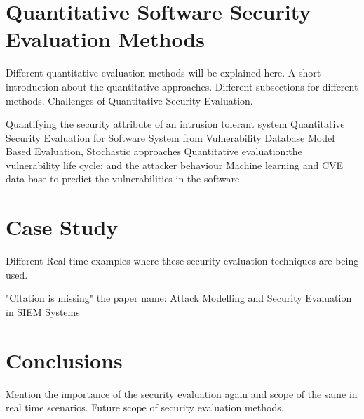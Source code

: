\documentclass[pdftex,english,oribibl]{llncs}
\begin{document}
\section{Quantitative Software Security Evaluation Methods}
Different quantitative evaluation methods will be explained here.\newline
A short introduction about the quantitative approaches.\newline
Different subsections for different methods.\newline
Challenges of Quantitative Security Evaluation.\newline

  	Quantifying the security attribute of an intrusion tolerant system\cite{1028941}\newline
  	Quantitative Security Evaluation for Software System from Vulnerability Database\cite{Okamura:2013:QSESVD}\newline
 	Model Based Evaluation, Stochastic approaches\cite{1335467}\newline
  	Quantitative evaluation:the vulnerability life cycle; and the attacker behaviour\cite{5315969}\newline
  	Machine learning and CVE data base to predict the vulnerabilities in the software\cite{Jain:2017:CAE:3102980.3102991}\newline
  	
\section{Case Study}
Different Real time examples where these security evaluation techniques are being used.\newline

	\cite{Kotenko}\newline
	"Citation is missing" the paper name: Attack Modelling and Security Evaluation in SIEM Systems\newline
	
\section{Conclusions}\label{sec:conclusions}
Mention the importance of the security evaluation again and scope of the same in real time scenarios.
Future scope of security evaluation methods.


\end{document}
